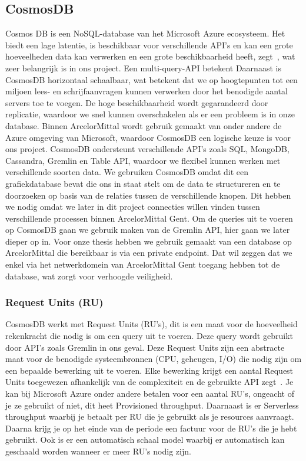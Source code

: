 \subsection{CosmosDB}
Cosmos DB is een NoSQL-database van het Microsoft Azure ecosysteem. Het biedt een lage latentie, is beschikbaar voor verschillende API's en kan een grote hoeveelheden data kan verwerken en een grote beschikbaarheid heeft, zegt~\textcite{CosmosDB2024}, wat zeer belangrijk is in ons project.
Een multi-query-API betekent 
Daarnaast is CosmosDB horizontaal schaalbaar, wat betekent dat we op hoogtepunten tot een miljoen lees- en schrijfaanvragen kunnen verwerken door het benodigde aantal servers toe te voegen.
De hoge beschikbaarheid wordt gegarandeerd door replicatie, waardoor we snel kunnen overschakelen als er een probleem is in onze database.
Binnen ArcelorMittal wordt gebruik gemaakt van onder andere de Azure omgeving van Microsoft, waardoor CosmosDB een logische keuze is voor ons project.
CosmosDB ondersteunt verschillende API's zoals SQL, MongoDB, Cassandra, Gremlin en Table API, waardoor we flexibel kunnen werken met verschillende soorten data.
We gebruiken CosmosDB omdat dit een grafiekdatabase bevat die ons in staat stelt om de data te structureren en te doorzoeken op basis van de relaties tussen de verschillende knopen.
Dit hebben we nodig omdat we later in dit project connecties willen vinden tussen verschillende processen binnen ArcelorMittal Gent.
Om de queries uit te voeren op CosmosDB gaan we gebruik maken van de Gremlin API, hier gaan we later dieper op in.
Voor onze thesis hebben we gebruik gemaakt van een database op ArcelorMittal die bereikbaar is via een private endpoint.
Dat wil zeggen dat we enkel via het netwerkdomein van ArcelorMittal Gent toegang hebben tot de database, wat zorgt voor verhoogde veiligheid.

\subsubsection{Request Units (RU)}
CosmosDB werkt met Request Units (RU's), dit is een maat voor de hoeveelheid rekenkracht die nodig is om een query uit te voeren.
Deze query wordt gebruikt door API's zoals Gremlin in ons geval. Deze Request Units zijn een abstracte maat voor de benodigde systeembronnen (CPU, geheugen, I/O) die nodig zijn om een bepaalde bewerking uit te voeren.
Elke bewerking krijgt een aantal Request Units toegewezen afhankelijk van de complexiteit en de gebruikte API zegt~\textcite{Brown2024}.
Je kan bij Microsoft Azure onder andere betalen voor een aantal RU's, ongeacht of je ze gebruikt of niet, dit heet Provisioned throughput.
Daarnaast is er Serverless throughput waarbij je betaalt per RU die je gebruikt als je resources aanvraagt. Daarna krijg je op het einde van de periode een factuur voor de RU's die je hebt gebruikt.
Ook is er een automatisch schaal model waarbij er automatisch kan geschaald worden wanneer er meer RU's nodig zijn.

